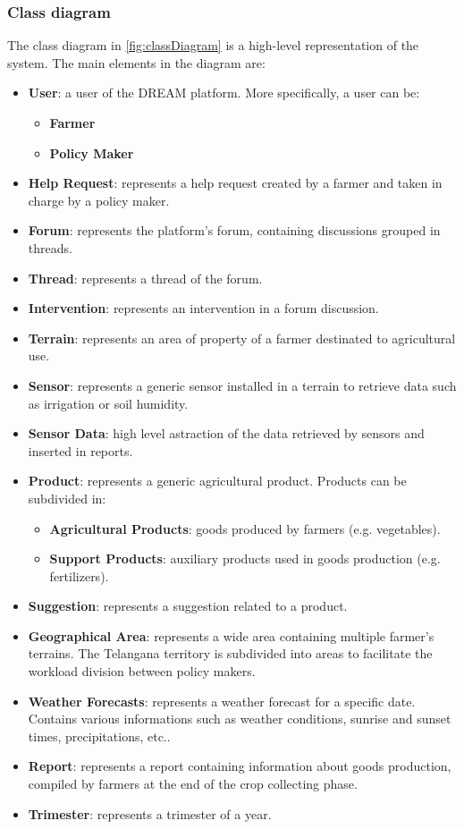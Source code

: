\documentclass[10pt]{article}
\begin{document}
\subsubsection{Class diagram}
The class diagram in \ref{fig:classDiagram} is a high-level representation of the system\cite{UML}. The main elements in the diagram are:
\begin{itemize}
    \item \textbf{User}: a user of the DREAM platform. More specifically, a user can be:
    \begin{itemize}
        \item \textbf{Farmer}
        \item \textbf{Policy Maker}
    \end{itemize} 
    \item \textbf{Help Request}: represents a help request created by a farmer and taken in charge by a policy maker.
    \item \textbf{Forum}: represents the platform's forum, containing discussions grouped in threads.
    \item \textbf{Thread}: represents a thread of the forum.
    \item \textbf{Intervention}: represents an intervention in a forum discussion.
    \item \textbf{Terrain}: represents an area of property of a farmer destinated to agricultural use.
    \item \textbf{Sensor}: represents a generic sensor installed in a terrain to retrieve data such as irrigation or soil humidity.
    \item \textbf{Sensor Data}: high level astraction of the data retrieved by sensors and inserted in reports.
    \item \textbf{Product}: represents a generic agricultural product. Products can be subdivided in:
    \begin{itemize}
        \item \textbf{Agricultural Products}: goods produced by farmers (e.g. vegetables).
        \item \textbf{Support Products}: auxiliary products used in goods production (e.g. fertilizers).
    \end{itemize} 
    \item \textbf{Suggestion}: represents a suggestion related to a product.
    \item \textbf{Geographical Area}: represents a wide area containing multiple farmer's terrains. The Telangana territory is subdivided into areas to facilitate the workload division between policy makers.
    \item \textbf{Weather Forecasts}: represents a weather forecast for a specific date. Contains various informations such as weather conditions, sunrise and sunset times, precipitations, etc..
    \item \textbf{Report}: represents a report containing information about goods production, compiled by farmers at the end of the crop collecting phase.
    \item \textbf{Trimester}: represents a trimester of a year.
\end{itemize}
\end{document}
